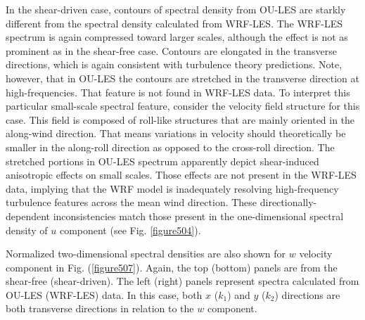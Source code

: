 In the shear-driven case, contours of spectral density from OU-LES are starkly different from the spectral density calculated from WRF-LES. The WRF-LES spectrum is again compressed toward larger scales, although the effect is not as prominent as in the shear-free case. Contours are elongated in the transverse directions, which is again consistent with turbulence theory predictions. Note, however, that in OU-LES the contours are stretched in the transverse direction at high-frequencies. That feature is not found in WRF-LES data. To interpret this particular small-scale spectral feature, consider the velocity field structure for this case. This field is composed of roll-like structures that are mainly oriented in the along-wind direction. That means variations in velocity should theoretically be smaller in the along-roll direction as opposed to the cross-roll direction. The stretched portions in OU-LES spectrum apparently depict shear-induced anisotropic effects on small scales. Those effects are not present in the WRF-LES data, implying that the WRF model is inadequately resolving high-frequency turbulence features across the mean wind direction. These directionally-dependent inconsistencies match those present in the one-dimensional spectral density of $u$ component (see Fig. \autoref{figure504}).

Normalized two-dimensional spectral densities are also shown for $w$ velocity component in Fig. (\autoref{figure507}). Again, the top (bottom) panels are from the shear-free (shear-driven). The left (right) panels represent spectra calculated from OU-LES (WRF-LES) data. In this case, both $x$ ($k_1$) and $y$ ($k_2$) directions are both transverse directions in relation to the $w$ component. 


